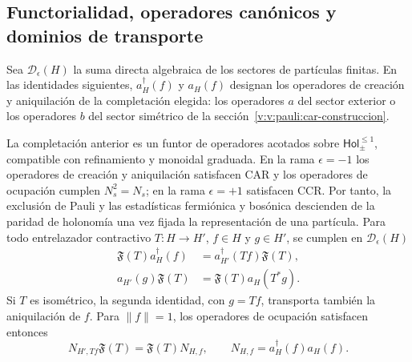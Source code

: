\subsection{Functorialidad, operadores canónicos y dominios de transporte}
\label{v:v:rec:fock_gibbs:section:03}

Sea \(\mathcal D_\epsilon(H)\) la suma directa algebraica de los sectores
de partículas finitas. En las identidades siguientes, \(a_H^\dagger(f)\)
y \(a_H(f)\) designan los operadores de creación y aniquilación de la
completación elegida: los operadores \(a\) del sector exterior o los
operadores \(b\) del sector simétrico de la
sección~\ref{v:v:pauli:car-construccion}.

\begin{theorem}
\label{v:v:rec:fock_gibbs:statement:01}
La completación anterior es un funtor de operadores acotados sobre
\(\mathsf{Hol}_{\pm}^{\leq1}\), compatible con refinamiento y
monoidal graduada. En la rama \(\epsilon=-1\) los operadores de creación y
aniquilación satisfacen CAR y los operadores de ocupación cumplen
\(N_s^2=N_s\); en la rama \(\epsilon=+1\) satisfacen CCR. Por tanto, la
exclusión de Pauli y las estadísticas fermiónica y bosónica descienden de la
paridad de holonomía una vez fijada la representación de una partícula.
Para todo entrelazador contractivo \(T:H\to H'\), \(f\in H\) y
\(g\in H'\), se cumplen en \(\mathcal D_\epsilon(H)\)
\begin{align}
 \mathfrak F(T)a_H^\dagger(f)
 &=a_{H'}^\dagger(Tf)\mathfrak F(T),
 \label{v:v:fock:eq:transporte-creacion}\\
 a_{H'}(g)\mathfrak F(T)
 &=\mathfrak F(T)a_H(T^*g).
 \label{v:v:fock:eq:transporte-aniquilacion}
\end{align}
Si \(T\) es isométrico, la segunda identidad, con \(g=Tf\), transporta
también la aniquilación de \(f\). Para \(\|f\|=1\), los operadores de
ocupación satisfacen entonces
\begin{equation}
 N_{H',Tf}\mathfrak F(T)=\mathfrak F(T)N_{H,f},
 \qquad N_{H,f}=a_H^\dagger(f)a_H(f).
 \label{v:v:fock:eq:transporte-ocupacion}
\end{equation}
\end{theorem}

